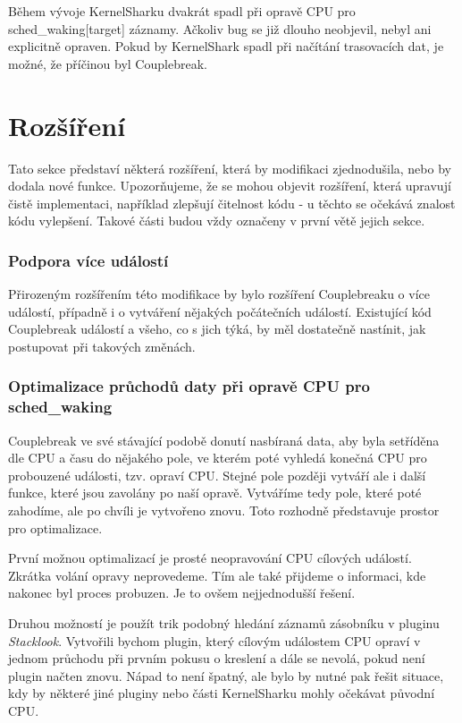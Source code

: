 Během vývoje KernelSharku dvakrát spadl při opravě CPU pro sched\_waking[target] záznamy. Ačkoliv bug se již dlouho neobjevil, nebyl ani explicitně opraven. Pokud by KernelShark spadl při načítání trasovacích dat, je možné, že příčinou byl Couplebreak.

\section{Rozšíření}
Tato sekce představí některá rozšíření, která by modifikaci zjednodušila, nebo by dodala nové funkce. Upozorňujeme, že se mohou objevit rozšíření, která upravují čistě implementaci, například zlepšují čitelnost kódu - u těchto se očekává znalost kódu vylepšení. Takové části budou vždy označeny v první větě jejich sekce.

\subsubsection*{Podpora více událostí}
Přirozeným rozšířením této modifikace by bylo rozšíření Couplebreaku o více událostí, případně i o vytváření nějakých počátečních událostí. Existující kód Couplebreak událostí a všeho, co s jich týká, by měl dostatečně nastínit, jak postupovat při takových změnách.

\subsubsection*{Optimalizace průchodů daty při opravě CPU pro sched\_waking}
Couplebreak ve své stávající podobě donutí nasbíraná data, aby byla setříděna dle CPU a času do nějakého pole, ve kterém poté vyhledá konečná CPU pro probouzené události, tzv. opraví CPU. Stejné pole později vytváří ale i další funkce, které jsou zavolány po naší opravě. Vytváříme tedy pole, které poté zahodíme, ale po chvíli je vytvořeno znovu. Toto rozhodně představuje prostor pro optimalizace.

První možnou optimalizací je prosté neopravování CPU cílových událostí. Zkrátka volání opravy neprovedeme. Tím ale také přijdeme o informaci, kde nakonec byl proces probuzen. Je to ovšem nejjednodušší řešení.

Druhou možností je použít trik podobný hledání záznamů zásobníku v pluginu \emph{Stacklook}. Vytvořili bychom plugin, který cílovým událostem CPU opraví v jednom průchodu při prvním pokusu o kreslení a dále se nevolá, pokud není plugin načten znovu. Nápad to není špatný, ale bylo by nutné pak řešit situace, kdy by některé jiné pluginy nebo části KernelSharku mohly očekávat původní CPU.

